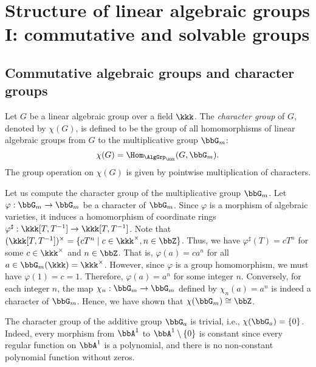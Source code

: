 \section{Structure of linear algebraic groups I: commutative and solvable groups}


\subsection{Commutative algebraic groups and character groups}

    \begin{definition}\label{def:character_group_of_linear_algebraic_group}
        Let \(G\) be a linear algebraic group over a field \(\kkk\). 
        The \emph{character group} of \(G\), denoted by \(\chi(G)\), is defined to be the group of all homomorphisms of linear algebraic groups from \(G\) to the multiplicative group \(\bbG_m\):
        \[
            \chi(G) = \Hom_{\AlgGrp_\kkk}(G, \bbG_m).
        \]
        The group operation on \(\chi(G)\) is given by pointwise multiplication of characters.
    \end{definition}

    \begin{example}\label{eg:character_group_of_G_m}
        Let us compute the character group of the multiplicative group \(\bbG_m\).
        Let \(\varphi: \bbG_m \to \bbG_m\) be a character of \(\bbG_m\). 
        Since \(\varphi\) is a morphism of algebraic varieties, it induces a homomorphism of coordinate rings \(\varphi^\sharp: \kkk[T, T^{-1}] \to \kkk[T, T^{-1}]\).
        Note that \((\kkk[T, T^{-1}])^\times = \{ c T^n \mid c \in \kkk^\times, n \in \bbZ \}\). 
        Thus, we have \(\varphi^\sharp(T) = c T^n\) for some \(c \in \kkk^\times\) and \(n \in \bbZ\).
        That is, \(\varphi(a) = c a^n\) for all \(a \in \bbG_m(\kkk) = \kkk^\times\). 
        However, since \(\varphi\) is a group homomorphism, we must have \(\varphi(1) = c = 1\). 
        Therefore, \(\varphi(a) = a^n\) for some integer \(n\). 
        Conversely, for each integer \(n\), the map \(\chi_n: \bbG_m \to \bbG_m\) defined by \(\chi_n(a) = a^n\) is indeed a character of \(\bbG_m\). 
        Hence, we have shown that \(\chi(\bbG_m) \cong \bbZ\).
    \end{example}

    \begin{example}\label{eg:character_group_of_G_a}
        The character group of the additive group \(\bbG_a\) is trivial, i.e., \(\chi(\bbG_a) = \{0\}\).
        Indeed, every morphism from \(\bbA^1\) to \(\bbA^1 \setminus \{0\}\) is constant since every regular function on \(\bbA^1\) is a polynomial, and there is no non-constant polynomial function without zeros.
    \end{example}

